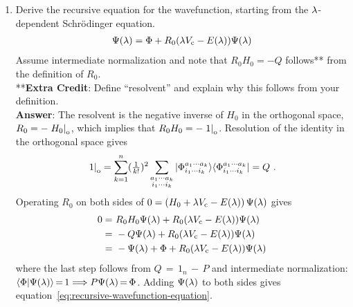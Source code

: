 \documentclass[11pt]{article}
\begin{document}
\begin{enumerate}
\item
Derive the recursive equation for the wavefunction, starting from the $\lambda $-dependent Schr\"odinger equation.
\begin{align}
\label{eq:recursive-wavefunction-equation}
  \Psi (\lambda )
=
  \Phi 
+
  R_0
  (
    \lambda  V_{\mathrm{c}}
  -
    E(\lambda )
  )
  \Psi (\lambda )
\end{align}
Assume intermediate normalization and note that $R_0H_0=-Q$ follows** from the definition of $R_0$.\\[10pt]
**\textbf{Extra Credit}: Define ``resolvent'' and explain why this follows from your definition.\\[10pt]
\textbf{Answer}:
The resolvent is the negative inverse of $H_0$ in the orthogonal space,
$
  R_0
=
-
\left.
  H_0
\right|_{\mathrm{o}}
$,
which implies that
$
  R_0H_0
=
-
\left.
  1
\right|_{\mathrm{o}}
$.
Resolution of the identity in the orthogonal space gives
\begin{align*}
\left.
  1
\right|_{\mathrm{o}}
=
  \sum_{k=1}^n
  (\tfrac{1}{k!})^2
  \sum_{\substack{a_1\cdots a_k\\i_1\cdots i_k}}
  |\Phi ^{a_1\cdots a_k}_{i_1\cdots i_k}\rangle
  \langle\Phi ^{a_1\cdots a_k}_{i_1\cdots i_k}|
=
  Q\,\,.
\end{align*}
Operating $R_0$ on both sides of $0=\left(H_0 + \lambda  V_{\mathrm{c}}-E(\lambda )\right)\Psi (\lambda )$ gives
\begin{align*}
  0
=&\
  R_0
  H_0
  \Psi (\lambda )
+
  R_0
  (
    \lambda  V_{\mathrm{c}}
  -
    E(\lambda )
  )
  \Psi (\lambda )
\\=&\
-
  Q
  \Psi (\lambda )
+
  R_0
  (
    \lambda  V_{\mathrm{c}}
  -
    E(\lambda )
  )
  \Psi (\lambda )
\\=&\
-
  \Psi (\lambda )
+
  \Phi 
+
  R_0
  (
    \lambda  V_{\mathrm{c}}
  -
    E(\lambda )
  )
  \Psi (\lambda )
\end{align*}
where the last step follows from
$
  Q
\,{=}\,
  1_n
\,{-}\,
  P
$
and intermediate normalization:
$
  \langle\Phi |\Psi (\lambda )\rangle
\,{=}\,
  1
{\implies}
  P\Psi (\lambda )
\,{=}\,
  \Phi 
$.
Adding $\Psi (\lambda )$ to both sides gives equation~\ref{eq:recursive-wavefunction-equation}.


\end{enumerate}
\end{document}
